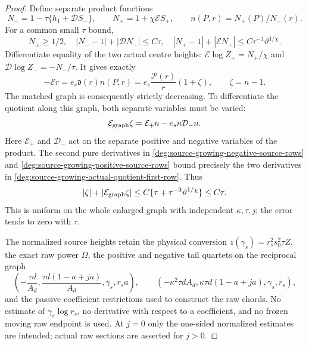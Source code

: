 \begin{proof}
Define separate product functions
\begin{equation}
 N_-=1-\tau\{h_1+\mathcal DS_-\},\qquad
 N_+=1+\chi\mathcal ES_+,\qquad n(P,r)=N_+(P)/N_-(r).
 \label{deg:source-growing-separate-action-numerators}
\end{equation}
For a common small \(\tau\) bound,
\begin{equation}
 N_\pm\ge1/2,\quad
 |N_--1|+|\mathcal DN_-|\le C\tau,\quad
 |N_+-1|+|\mathcal EN_+|
                       \le C\tau^{-3}\vartheta^{1/\chi}.
 \label{deg:source-growing-action-numerator-rows}
\end{equation}
Differentiate equality of the two actual centre heights:
\(\mathcal E\log Z_+=N_+/\chi\) and
\(\mathcal D\log Z_-=-N_-/\tau\).
It gives exactly
\begin{equation}
 -\mathcal E r=e_s\mathfrak d(r)n(P,r)
     =e_s\frac{\mathcal P(r)}r(1+\zeta),\qquad \zeta=n-1 .
 \label{deg:source-growing-actual-matching-slope}
\end{equation}
The matched graph is consequently strictly decreasing. To differentiate
the quotient along this graph, both separate variables must be varied:
\begin{equation}
 \mathcal E_{\rm graph}\zeta=
 \mathcal E_+n-e_sn\mathcal D_-n .
 \label{deg:source-growing-actual-quotient-first-row}
\end{equation}
Here \(\mathcal E_+\) and \(\mathcal D_-\) act on the separate
positive and negative variables of the product.
The second pure derivatives in \eqref{deg:source-growing-negative-source-rows}
and \eqref{deg:source-growing-positive-source-rows} bound precisely
the two derivatives in \eqref{deg:source-growing-actual-quotient-first-row}.  Thus
\begin{equation}
 |\zeta|+|\mathcal E_{\rm graph}\zeta|
 \le C\{\tau+\tau^{-3}\vartheta^{1/\chi}\}
 \le C\tau .
 \label{deg:source-growing-actual-quotient-estimates}
\end{equation}
This is uniform on the whole enlarged graph with independent
$\kappa,\tau,j$; the error tends to zero with $\tau$.

The normalized source heights retain the physical conversion
\(z(\gamma_s)=r_s^2s_0^2\tau Z\), the exact raw power
\(\Omega\), the positive and negative tail quartets on the
reciprocal graph
\begin{equation}
 \left(-\frac{\tau d}{A_d},
       \frac{\tau d(1-a+ja)}{A_d},\gamma_s,r_sa\right),
 \qquad
 \left(-\kappa^2\tau dA_d,
       \kappa\tau d(1-a+ja),\gamma_s,r_s\right),
 \label{deg:source-growing-remote-raw-quartets}
\end{equation}
and the passive coefficient restrictions used to construct the raw
chords.  No estimate of \(\gamma_s\log r_s\), no derivative
with respect to a coefficient, and no frozen moving raw endpoint
is used.  At \(j=0\) only the one-sided normalized estimates
are intended; actual raw sections are asserted for \(j>0\).
\end{proof}


